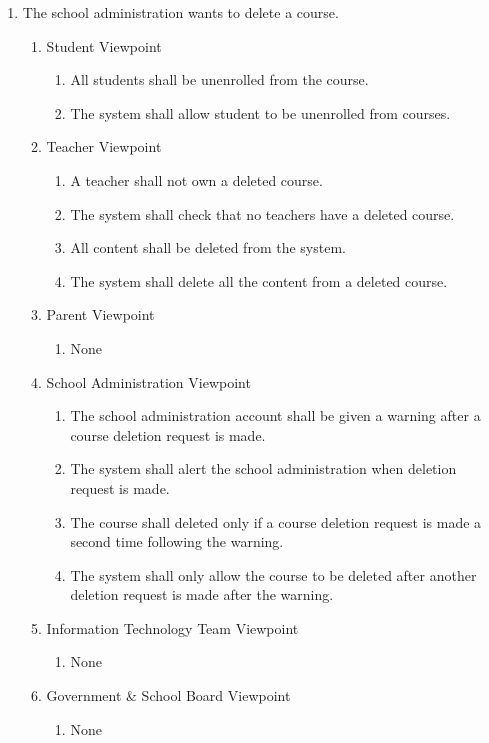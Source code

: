 \documentclass[]{article}
\begin{document}
\begin{enumerate}[{BE}1.]
	\item The school administration wants to delete a course.
	\begin{enumerate}[{VP1}.1]
		\item Student Viewpoint
			\begin{enumerate}
				\item All students shall be unenrolled from the course.
				\item The system shall allow student to be unenrolled from courses.
			\end{enumerate}
		\item Teacher Viewpoint
			\begin{enumerate}
				\item A teacher shall not own a deleted course.
				\item The system shall check that no teachers have a deleted course.
				\item{All content shall be deleted from the system.}
				\item The system shall delete all the content from a deleted course.
			\end{enumerate}
		\item Parent Viewpoint
			\begin{enumerate}
				\item None
			\end{enumerate}
		\item School Administration Viewpoint
			\begin{enumerate}
				\item The school administration account shall be given a warning after a
course
deletion request is made.
				\item The system shall alert the school administration when deletion request is made.
\item The course shall deleted only if a course deletion
request is made a second time following the warning.
\item The system shall only allow the course to be deleted after another deletion request is made after the warning.
			\end{enumerate}
		\item Information Technology Team Viewpoint
			\begin{enumerate}
				\item None
			\end{enumerate}
		\item Government \& School Board Viewpoint
			\begin{enumerate}
				\item None
			\end{enumerate}
	\end{enumerate}






\end{enumerate}
\end{document}
